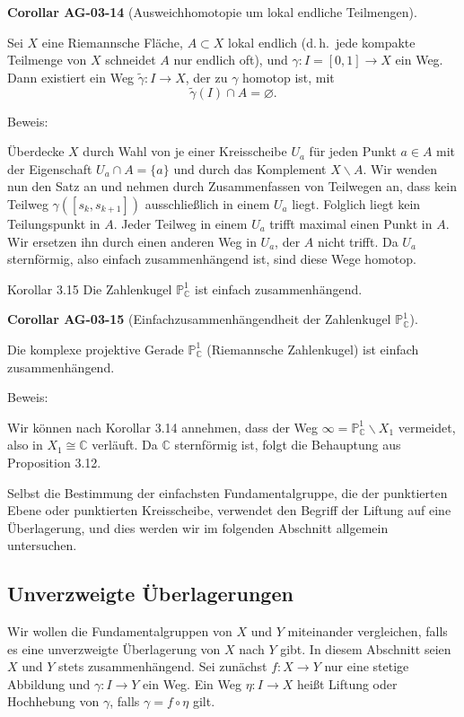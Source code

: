 \documentclass[10pt, letterpaper]{article}
\newcommand{\C}{\mathbb{C}}
\newcommand{\CustomHeading}[3]{%
  \par\medskip\noindent%
  \textbf{#1 #2} \textnormal{(#3)}.\enskip%
}
\newenvironment{KORO}[2]{\begin{unitbox}\CustomHeading{Corollar}{#1}{#2}}{\end{unitbox}}
\begin{document}
\begin{KORO}{AG-03-14}{Ausweichhomotopie um lokal endliche Teilmengen}
Sei $X$ eine Riemannsche Fläche, $A\subset X$ lokal endlich (d.\,h.\ jede kompakte Teilmenge von $X$ schneidet $A$ nur endlich oft), und
$\gamma:I=[0,1]\to X$ ein Weg. Dann existiert ein Weg $\widetilde\gamma:I\to X$, der zu $\gamma$ homotop ist, mit
\[
\widetilde\gamma(I)\cap A=\varnothing.
\]
\end{KORO}

Beweis: 

Überdecke $X$ durch Wahl von je einer Kreisscheibe $U_{a}$ für jeden Punkt $a \in A$ mit der Eigenschaft $U_{a} \cap A=\{a\}$ und durch das Komplement $X \backslash A$. Wir wenden nun den Satz an und nehmen durch Zusammenfassen von Teilwegen an, dass kein Teilweg $\gamma\left(\left[s_{k}, s_{k+1}\right]\right)$ ausschließlich in einem $U_{a}$ liegt. Folglich liegt kein Teilungspunkt in $A$. Jeder Teilweg in einem $U_{a}$ trifft maximal einen Punkt in $A$. Wir ersetzen ihn durch einen anderen Weg in $U_{a}$, der $A$ nicht trifft. Da $U_{a}$ sternförmig, also einfach zusammenhängend ist, sind diese Wege homotop.



Korollar 3.15 Die Zahlenkugel $\mathbb{P}_{\mathbb{C}}^{1}$ ist einfach zusammenhängend.

\begin{KORO}{AG-03-15}{Einfachzusammenhängendheit der Zahlenkugel $\mathbb{P}^1_\C$}
Die komplexe projektive Gerade $\mathbb{P}^1_\C$ (Riemannsche Zahlenkugel) ist einfach zusammenhängend.
\end{KORO}


Beweis: 

Wir können nach Korollar 3.14 annehmen, dass der Weg $\infty=\mathbb{P}_{\mathbb{C}}^{1} \backslash X_{1}$ vermeidet, also in $X_{1} \cong \mathbb{C}$ verläuft. Da $\mathbb{C}$ sternförmig ist, folgt die Behauptung aus Proposition 3.12.



Selbst die Bestimmung der einfachsten Fundamentalgruppe, die der punktierten Ebene oder punktierten Kreisscheibe, verwendet den Begriff der Liftung auf eine Überlagerung, und dies werden wir im folgenden Abschnitt allgemein untersuchen.



\pagebreak

\subsection{Unverzweigte Überlagerungen}
Wir wollen die Fundamentalgruppen von $X$ und $Y$ miteinander vergleichen, falls es eine unverzweigte Überlagerung von $X$ nach $Y$ gibt. In diesem Abschnitt seien $X$ und $Y$ stets zusammenhängend. Sei zunächst $f: X \rightarrow Y$ nur eine stetige Abbildung und $\gamma: I \rightarrow Y$ ein Weg. Ein Weg $\eta: I \rightarrow X$ heißt Liftung oder Hochhebung von $\gamma$, falls $\gamma=f \circ \eta$ gilt.
\end{document}

